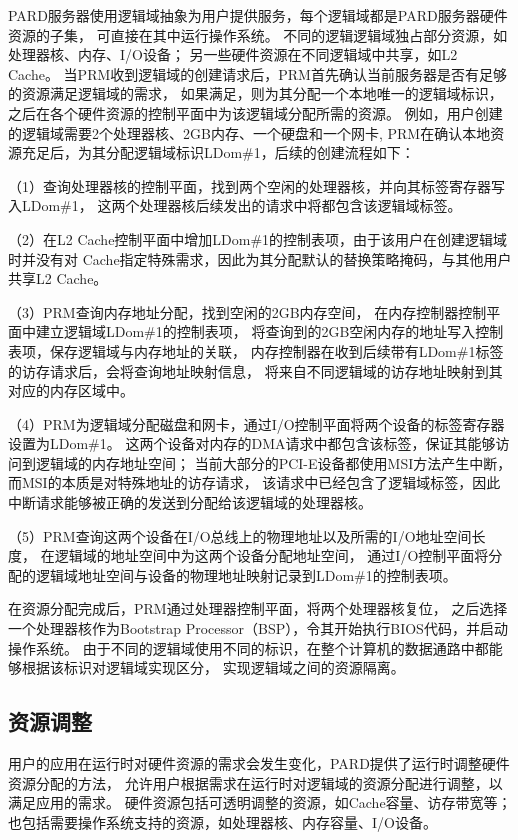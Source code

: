 PARD服务器使用逻辑域抽象为用户提供服务，每个逻辑域都是PARD服务器硬件资源的子集，
可直接在其中运行操作系统。
不同的逻辑逻辑域独占部分资源，如处理器核、内存、I/O设备；
另一些硬件资源在不同逻辑域中共享，如L2 Cache。
当PRM收到逻辑域的创建请求后，PRM首先确认当前服务器是否有足够的资源满足逻辑域的需求，
如果满足，则为其分配一个本地唯一的逻辑域标识，
之后在各个硬件资源的控制平面中为该逻辑域分配所需的资源。
例如，用户创建的逻辑域需要2个处理器核、2GB内存、一个硬盘和一个网卡,
PRM在确认本地资源充足后，为其分配逻辑域标识LDom\#1，后续的创建流程如下：

（1）查询处理器核的控制平面，找到两个空闲的处理器核，并向其标签寄存器写入LDom\#1，
这两个处理器核后续发出的请求中将都包含该逻辑域标签。

（2）在L2 Cache控制平面中增加LDom\#1的控制表项，由于该用户在创建逻辑域时并没有对
Cache指定特殊需求，因此为其分配默认的替换策略掩码，与其他用户共享L2 Cache。

（3）PRM查询内存地址分配，找到空闲的2GB内存空间，
在内存控制器控制平面中建立逻辑域LDom\#1的控制表项，
将查询到的2GB空闲内存的地址写入控制表项，保存逻辑域与内存地址的关联，
内存控制器在收到后续带有LDom\#1标签的访存请求后，会将查询地址映射信息，
将来自不同逻辑域的访存地址映射到其对应的内存区域中。

（4）PRM为逻辑域分配磁盘和网卡，通过I/O控制平面将两个设备的标签寄存器设置为LDom\#1。
这两个设备对内存的DMA请求中都包含该标签，保证其能够访问到逻辑域的内存地址空间；
当前大部分的PCI-E设备都使用MSI方法产生中断，而MSI的本质是对特殊地址的访存请求，
该请求中已经包含了逻辑域标签，因此中断请求能够被正确的发送到分配给该逻辑域的处理器核。

（5）PRM查询这两个设备在I/O总线上的物理地址以及所需的I/O地址空间长度，
在逻辑域的地址空间中为这两个设备分配地址空间，
通过I/O控制平面将分配的逻辑域地址空间与设备的物理地址映射记录到LDom\#1的控制表项。

在资源分配完成后，PRM通过处理器控制平面，将两个处理器核复位，
之后选择一个处理器核作为Bootstrap Processor（BSP），令其开始执行BIOS代码，并启动操作系统。
由于不同的逻辑域使用不同的标识，在整个计算机的数据通路中都能够根据该标识对逻辑域实现区分，
实现逻辑域之间的资源隔离。


\subsection{资源调整}

用户的应用在运行时对硬件资源的需求会发生变化，PARD提供了运行时调整硬件资源分配的方法，
允许用户根据需求在运行时对逻辑域的资源分配进行调整，以满足应用的需求。
硬件资源包括可透明调整的资源，如Cache容量、访存带宽等；
也包括需要操作系统支持的资源，如处理器核、内存容量、I/O设备。

